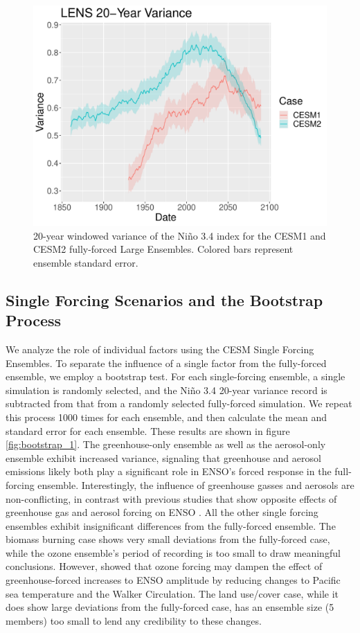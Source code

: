 \documentclass[11pt]{article}
\begin{document}
\begin{figure}
\centering
\includegraphics[width=.5\linewidth]{../../data/figures/ff_compare.pdf}
\caption{\label{fig:variance_2}20-year windowed variance of the Niño 3.4 index for the CESM1 and CESM2 fully-forced Large Ensembles. Colored bars represent ensemble standard error.}
\end{figure}


\subsection{Single Forcing Scenarios and the Bootstrap Process}

We analyze the role of individual factors using the CESM Single Forcing Ensembles. To separate the influence of a single factor from the fully-forced ensemble, we employ a bootstrap test. For each single-forcing ensemble, a single simulation is randomly selected, and the Niño 3.4 20-year variance record is subtracted from that from a randomly selected fully-forced simulation. We repeat this process 1000 times for each ensemble, and then calculate the mean and standard error for each ensemble. These results are shown in figure \ref{fig:bootstrap_1}. The greenhouse-only ensemble as well as the aerosol-only ensemble exhibit increased variance, signaling that greenhouse and aerosol emissions likely both play a significant role in ENSO's forced response in the full-forcing ensemble. Interestingly, the influence of greenhouse gasses and aerosols are non-conflicting, in contrast with previous studies that show opposite effects of greenhouse gas and aerosol forcing on ENSO \citep{stevenson2017forced}. All the other single forcing ensembles exhibit insignificant differences from the fully-forced ensemble. The biomass burning case shows very small deviations from the fully-forced case, while the ozone ensemble's period of recording is too small to draw meaningful conclusions. However, \citet{nowack2017role} showed that ozone forcing may dampen the effect of greenhouse-forced increases to ENSO amplitude by reducing changes to Pacific sea temperature and the Walker Circulation. The land use/cover case, while it does show large deviations from the fully-forced case, has an ensemble size (5 members) too small to lend any credibility to these changes.
\end{document}
